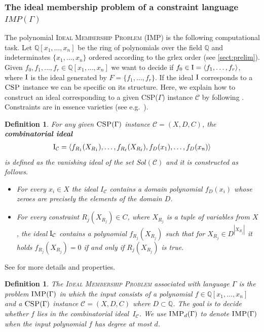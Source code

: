 \documentclass[11pt]{article}
\newcommand{\Cc}{\mathcal{C}}
\newcommand{\GIdeal}[1]{\left\langle #1 \right\rangle}
\newcommand{\CSP}{\textsc{CSP}}
\newcommand{\IMP}{\textsc{IMP}}
\newcommand{\grlex}{\textsf{grlex }}
\newcommand{\I}{\emph{$\rm{I}$}}
\newcommand{\1}{\textbf{1}}
\newcommand{\Field}{\mathbb{Q}}
\newtheorem{definition}[theorem]{Definition}
\begin{document}
\subsubsection[The ideal membership problem of a constraint language IMP(Gamma)]{The ideal membership problem of a constraint language $IMP(\Gamma)$}\label{sec:IMPdef}

The polynomial \textsc{Ideal Membership Problem} (\IMP) is the following computational task.
Let $\Field[x_1, \ldots, x_n]$ be the ring of polynomials over the field $\Field$ and indeterminates $\{x_1,\ldots, x_n\}$ ordered according to the \grlex order (see \cref{sect:prelim}).
Given $f_0,f_1,\ldots,f_r\in \Field[x_1, \ldots, x_n]$ we want to decide if $f_0\in \I= \GIdeal{f_1,\ldots, f_r}$, where $\I$ is the ideal generated by $F=\{f_1,\ldots , f_r\}$.
If the ideal $\I$ corresponds to a $\CSP$ instance we can be specific on its structure. 
Here, we explain how to construct an ideal corresponding to a given CSP($\Gamma$) instance $\Cc$ by following \cite{Mastrolilli21TALG}. Constraints are in essence varieties (see e.g.~\cite{vandongenPhd,JeffersonJGD13}). 
\begin{definition}\label{def:combinatorial_ideal}
For any given $\CSP(\Gamma)$ instance $\Cc=(X,D,C)$, the \textbf{\emph{combinatorial ideal}} 
%
\begin{align}\label{eq:comb_Id}
    \I_\Cc=\langle f_{R_1}(X_{R_1}),\ldots,f_{R_\ell}(X_{R_\ell}),f_D(x_1),\ldots,f_D(x_n)\rangle
\end{align} 
%
is defined as the vanishing ideal of the set $Sol(\Cc)$ and it is constructed as follows.
\begin{itemize}
    \item For every $x_i\in X$ the ideal $I_\Cc$ contains a domain polynomial $f_D(x_i)$ whose zeroes are precisely the elements of the domain $D$.
    \item For every constraint $R_j(X_{R_j})\in C$, where $X_{R_j}$ is a tuple of variables from $X$, the ideal $\I_\Cc$ contains a polynomial $f_{R_j}(X_{R_j})$ such that for $X_{R_j}\in D^{|X_{R_j}|}$ it holds $f_{R_j}(X_{R_j})=0$ if and only if $R_j(X_{R_j})$ is true.
\end{itemize}   
\end{definition}
  See \cite{Mastrolilli21TALG} for more details and properties. 
%
%
\begin{definition}\label{def:IMP}
 The {\emph{\textsc{Ideal Membership Problem}}} associated with language $\Gamma$ is the problem $\IMP(\Gamma)$ in which
 the input consists of a polynomial $f\in \Field[x_1, \ldots, x_n]$ and a $\CSP(\Gamma)$ instance $\Cc=(X,D,C)$ where $D\subset \Field$. The goal is to decide whether $f$ lies in the combinatorial ideal~$I_\Cc$. We use $\IMP_d(\Gamma)$ to denote $\IMP(\Gamma)$ when the input polynomial $f$ has degree at most $d$.
\end{definition}
\end{document}
